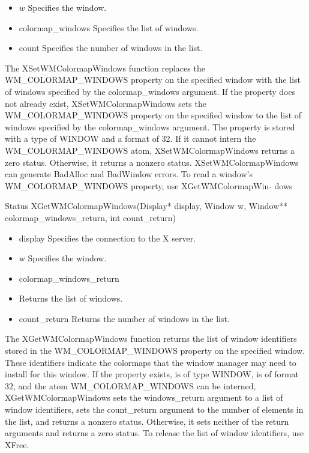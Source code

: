 \documentclass{report}
\begin{document}
\begin{itemize}
\begin{itemize}
\begin{itemize}
                \item $w$ Specifies the window.
                \item colormap\_windows Specifies the list of windows.
                \item count Specifies the number of windows in the list.
            \end{itemize}
            The XSetWMColormapWindows function replaces the WM\_COLORMAP\_WINDOWS property on the specified window with the list of windows specified by the colormap\_windows argument. If the property does not already exist, XSetWMColormapWindows sets the WM\_COLORMAP\_WINDOWS property on the specified window to the list of windows specified by the colormap\_windows argument. The property is stored with a type of WINDOW and a format of 32. If it cannot intern the WM\_COLORMAP\_WINDOWS atom, XSetWMColormapWindows returns a zero status. Otherwise, it returns a nonzero status.
            \bigbreak \noindent 
            XSetWMColormapWindows can generate BadAlloc and BadWindow errors.
            \bigbreak \noindent 
            To read a window’s WM\_COLORMAP\_WINDOWS property, use XGetWMColormapWin- dows
            \bigbreak \noindent 
            \begin{cppcode}
            Status XGetWMColormapWindows(Display* display, Window w, Window** colormap_windows_return, int count_return)
            \end{cppcode}
            \begin{itemize}
                \item display Specifies the connection to the X server.
                \item w Specifies the window.
                \item colormap\_windows\_return
                \item Returns the list of windows.
                \item count\_return Returns the number of windows in the list.
            \end{itemize}
            The XGetWMColormapWindows function returns the list of window identifiers stored in the WM\_COLORMAP\_WINDOWS property on the specified window. These identifiers indicate the colormaps that the window manager may need to install for this window. If the property exists, is of type WINDOW, is of format 32, and the atom WM\_COLORMAP\_WINDOWS can be interned, XGetWMColormapWindows sets the windows\_return argument to a list of window identifiers, sets the count\_return argument to the number of elements in the list, and returns a nonzero status. Otherwise, it sets neither of the return arguments and returns a zero status. To release the list of window identifiers, use XFree.

\end{itemize}
\end{itemize}
\end{document}
